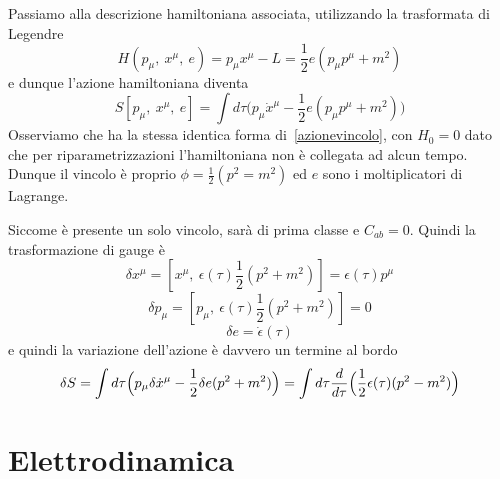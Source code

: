     \hfill

    Passiamo alla descrizione hamiltoniana associata, utilizzando la trasformata di Legendre 
\begin{equation*}
    H(p_\mu, ~x^\mu, ~e) = p_\mu x^\mu - L = \frac{1}{2} e (p_\mu p^\mu + m^2)
\end{equation*}
    e dunque l'azione hamiltoniana diventa 
\begin{equation*}
    S[p_\mu, ~x^\mu, ~e] = \int d\tau \Big(p_\mu \dot x^\mu - \frac{1}{2} e (p_\mu p^\mu + m^2) \Big)
\end{equation*}
    Osserviamo che ha la stessa identica forma di~\eqref{azionevincolo}, con $H_0 = 0$ dato che per riparametrizzazioni l'hamiltoniana non è collegata ad alcun tempo. Dunque il vincolo è proprio $\phi = \frac{1}{2} (p^2 = m^2)$ ed $e$ sono i moltiplicatori di Lagrange. 

    Siccome è presente un solo vincolo, sarà di prima classe e $C_{ab} = 0$. Quindi la trasformazione di gauge è
\begin{equation}
    \delta x^\mu = [x^\mu, ~\epsilon(\tau) \frac{1}{2} (p^2 + m^2)] = \epsilon(\tau) p^\mu
\end{equation}
\begin{equation}
    \delta p_\mu = [p_\mu, ~\epsilon(\tau) \frac{1}{2} (p^2 + m^2)] = 0
\end{equation}
\begin{equation}
    \delta e = \dot \epsilon(\tau)
\end{equation}
    e quindi la variazione dell'azione è davvero un termine al bordo
\begin{equation*}
    \delta S = \int d\tau \Big( p_\mu \delta \dot x^\mu - \frac{1}{2} \delta e (p^2 + m^2)\Big) = \int d\tau \frac{d}{d\tau} \Big (\frac{1}{2} \epsilon(\tau) (p^2 - m^2) \Big)
\end{equation*}

\section{Elettrodinamica} 

